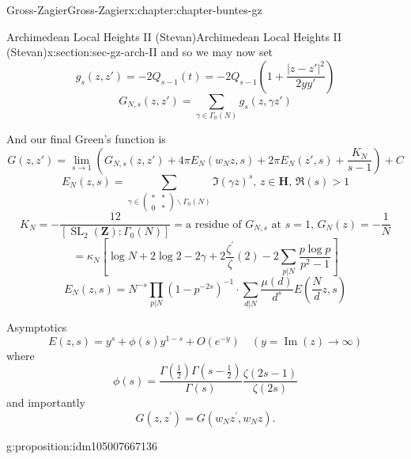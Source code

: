 \documentclass[oneside,10pt,]{book}
\numberwithin{equation}{section}
\newcommand{\lb}{[}
\newcommand{\rb}{]}
\newcommand{\ZZ}{\mathbf{Z}}
\newcommand{\HH}{\mathbf{H}}
\DeclareMathOperator{\SL}{SL}
\newcommand{\gt}{>}
\newcommand{\amp}{&}
\begin{document}
\begin{chapterptx}{Gross-Zagier}{}{Gross-Zagier}{}{}{x:chapter:chapter-buntes-gz}
\begin{sectionptx}{Archimedean Local Heights II (Stevan)}{}{Archimedean Local Heights II (Stevan)}{}{}{x:section:sec-gz-arch-II}
and so we may now set%
\begin{equation*}
g_s(z,z') = -2Q_{s-1}(t) = -2 Q_{s-1}\left(1+ \frac{|z-z'|^2}{2yy'}\right)
\end{equation*}
%
\begin{equation*}
G_{N,s}(z,z') = \sum_{\gamma \in \Gamma _0(N)} g_s(z,\gamma z')
\end{equation*}
%
\par
And our final Green's function is%
\begin{equation*}
G(z,z') = \lim_{s\to 1} (G_{N,s}(z,z') + 4\pi  E_N(w_N z,s) + 2\pi  E_N(z', s)+\frac{K_N}{s-1}) +C
\end{equation*}
%
\begin{equation*}
E_N(z,s) = \sum_{\gamma \in \begin{pmatrix}\ast\amp\ast\\0\amp\ast\end{pmatrix}\backslash \Gamma _0(N)} \Im(\gamma z)^s,\,z\in \HH,\,\Re(s) \gt 1
\end{equation*}
%
\begin{equation*}
K_N = -\frac{12}{\lb \SL_2(\ZZ) : \Gamma _0(N)\rb } = \text{a residue of }G_{N,s} \text{ at } s=1,\,G_N(z) = -\frac{1}{N}
\end{equation*}
%
\begin{equation*}
=\kappa_{N}\left[\log N+2 \log 2-2 \gamma+2 \frac{\zeta^{\prime}}{\zeta}(2)-2 \sum_{p | N} \frac{p \log p}{p^{2}-1}\right]
\end{equation*}
%
\begin{equation*}
E_{N}(z, s)=N^{-s} \prod_{p | N}\left(1-p^{-2 s}\right)^{-1} \cdot \sum_{d | N} \frac{\mu(d)}{d^{s}} E\left(\frac{N}{d} z, s\right)
\end{equation*}
%
\par
Asymptotics%
\begin{equation*}
E(z, s)=y^{s}+\phi(s) y^{1-s}+O\left(e^{-y}\right) \quad(y=\operatorname{Im}(z) \rightarrow \infty)
\end{equation*}
where%
\begin{equation*}
\phi(s)=\frac{\Gamma\left(\frac{1}{2}\right) \Gamma\left(s-\frac{1}{2}\right)}{\Gamma(s)} \frac{\zeta(2 s-1)}{\zeta(2 s)}
\end{equation*}
and importantly%
\begin{equation*}
G\left(z, z^{\prime}\right)=G\left(w_{N} z^{\prime}, w_{N} z\right)\text{.}
\end{equation*}
%
\begin{proposition}{}{}{g:proposition:idm105007667136}%

\end{proposition}
\end{sectionptx}
\end{chapterptx}
\end{document}
